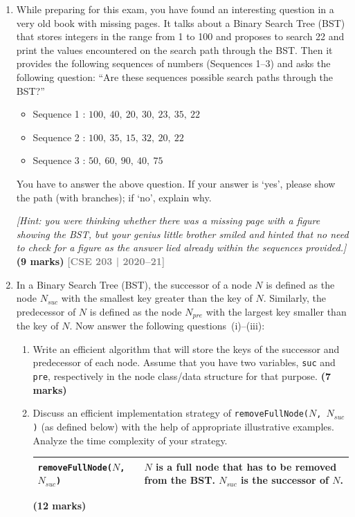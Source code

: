\documentclass[12pt,a3paper]{article}
\newcommand{\yr}[1]{\hfill\textcolor{gray}{\small\textbf{[#1]}}}
\newcommand{\mk}[1]{\textcolor{orange!70!black}{\small\textbf{(#1 marks)}}}
\begin{document}
\begin{enumerate}
\item While preparing for this exam, you have found an interesting question in a
very old book with missing pages. It talks about a Binary Search Tree (BST) that
stores integers in the range from 1 to 100 and proposes to search 22 and print
the values encountered on the search path through the BST. Then it provides the
following sequences of numbers (Sequences 1--3) and asks the following question:
``Are these sequences possible search paths through the BST?''
\begin{itemize}
  \item[] Sequence 1 : $100,\ 40,\ 20,\ 30,\ 23,\ 35,\ 22$
  \item[] Sequence 2 : $100,\ 35,\ 15,\ 32,\ 20,\ 22$
  \item[] Sequence 3 : $50,\ 60,\ 90,\ 40,\ 75$
\end{itemize}
You have to answer the above question. If your answer is `yes', please show the
path (with branches); if `no', explain why.

\textit{[Hint: you were thinking whether there was a missing page with a figure
showing the BST, but your genius little brother smiled and hinted that no need to
check for a figure as the answer lied already within the sequences provided.]}
\mk{9}
\yr{CSE 203 | 2020--21}


\item In a Binary Search Tree (BST), the successor of a node $N$ is defined as
the node $N_{suc}$ with the smallest key greater than the key of $N$. Similarly,
the predecessor of $N$ is defined as the node $N_{pre}$ with the largest key
smaller than the key of $N$. Now answer the following questions~(i)--(iii):
\begin{enumerate}[label=(\roman*)]
  \item Write an efficient algorithm that will store the keys of the successor
  and predecessor of each node. Assume that you have two variables, \texttt{suc}
  and \texttt{pre}, respectively in the node class/data structure for that
  purpose. \mk{7}

  \item Discuss an efficient implementation strategy of
  \texttt{removeFullNode($N$, $N_{suc}$)} (as defined below) with the help of
  appropriate illustrative examples. Analyze the time complexity of your
  strategy.
  \begin{center}
  \begin{tabular}{|p{4cm}|p{7cm}|}
  \hline
  \texttt{removeFullNode($N$, $N_{suc}$)} & $N$ is a full node that has to be
  removed from the BST. $N_{suc}$ is the successor of $N$. \\
  \hline
  \end{tabular}
  \end{center}
  \mk{12}


\end{enumerate}
\end{enumerate}
\end{document}
